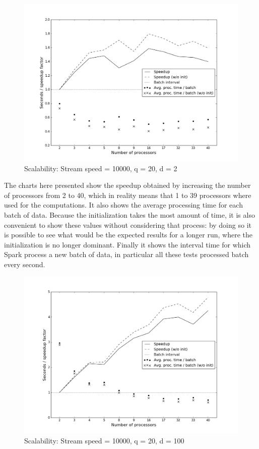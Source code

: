 \documentclass{llncs}
\begin{document}
\begin{figure}[h!]
 \centering
 \includegraphics[scale=0.39]{./styles/perf20-2.png}
 \caption{Scalability: Stream speed = 10000, q = 20, d = 2}
 \label{fig:perf20-2}
\end{figure}


The charts here presented show the speedup obtained by increasing the number of processors from 2 to 40, which in reality means that 1 to 39 processors where used for the computations. It also shows the average processing time for each batch of data. Because the initialization takes the most amount of time, it is also convenient to show these values without considering that process: by doing so it is possible to see what would be the expected results for a longer run, where the initialization is no longer dominant. Finally it shows the interval time for which Spark process a new batch of data, in particular all these tests processed batch every second.



\begin{figure}[h!]
 \centering
 \includegraphics[scale=0.4]{./styles/perf20-100.png}
 \caption{Scalability: Stream speed = 10000, q = 20, d = 100}
 \label{fig:perf20-100}
\end{figure}
\end{document}
